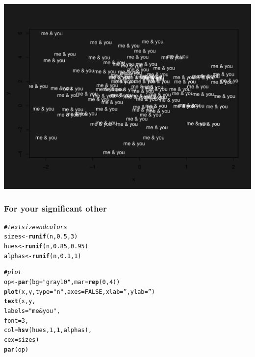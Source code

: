 \documentclass[12pt]{beamer}\usepackage[]{graphicx}\usepackage[]{color}
\makeatletter
\def\maxwidth{ %
  \ifdim\Gin@nat@width>\linewidth
    \linewidth
  \else
    \Gin@nat@width
  \fi
}
\newcommand{\hlnum}[1]{\textcolor[rgb]{0.686,0.059,0.569}{#1}}%
\newcommand{\hlstr}[1]{\textcolor[rgb]{0.192,0.494,0.8}{#1}}%
\newcommand{\hlcom}[1]{\textcolor[rgb]{0.678,0.584,0.686}{\textit{#1}}}%
\newcommand{\hlstd}[1]{\textcolor[rgb]{0.345,0.345,0.345}{#1}}%
\newcommand{\hlkwb}[1]{\textcolor[rgb]{0.69,0.353,0.396}{#1}}%
\newcommand{\hlkwc}[1]{\textcolor[rgb]{0.333,0.667,0.333}{#1}}%
\newcommand{\hlkwd}[1]{\textcolor[rgb]{0.737,0.353,0.396}{\textbf{#1}}}%
\newenvironment{kframe}{%
 \def\at@end@of@kframe{}%
 \ifinner\ifhmode%
  \def\at@end@of@kframe{\end{minipage}}%
  \begin{minipage}{\columnwidth}%
 \fi\fi%
 \def\FrameCommand##1{\hskip\@totalleftmargin \hskip-\fboxsep
 \colorbox{shadecolor}{##1}\hskip-\fboxsep
     \hskip-\linewidth \hskip-\@totalleftmargin \hskip\columnwidth}%
 \MakeFramed {\advance\hsize-\width
   \@totalleftmargin\z@ \linewidth\hsize
   \@setminipage}}%
 {\par\unskip\endMakeFramed%
 \at@end@of@kframe}
\newenvironment{knitrout}{}{} %
\makeatother
\begin{document}

\begin{frame}[fragile]

\begin{knitrout}
\color{fgcolor}
\includegraphics[width=\maxwidth]{figure/me-and-you2-1} 

\end{knitrout}

\end{frame}


\begin{frame}[fragile]
\frametitle{For your significant other}

\begin{knitrout}\footnotesize
{}\color{fgcolor}\begin{kframe}
\begin{alltt}
\hlcom{# text size and colors}
\hlstd{sizes} \hlkwb{<-} \hlkwd{runif}\hlstd{(n,} \hlnum{0.5}\hlstd{,} \hlnum{3}\hlstd{)}
\hlstd{hues} \hlkwb{<-} \hlkwd{runif}\hlstd{(n,} \hlnum{0.85}\hlstd{,} \hlnum{0.95}\hlstd{)}
\hlstd{alphas} \hlkwb{<-} \hlkwd{runif}\hlstd{(n,} \hlnum{0.1}\hlstd{,} \hlnum{1}\hlstd{)}

\hlcom{# plot}
\hlstd{op} \hlkwb{<-} \hlkwd{par}\hlstd{(}\hlkwc{bg} \hlstd{=} \hlstr{"gray10"}\hlstd{,} \hlkwc{mar} \hlstd{=} \hlkwd{rep}\hlstd{(}\hlnum{0}\hlstd{,} \hlnum{4}\hlstd{))}
\hlkwd{plot}\hlstd{(x, y,} \hlkwc{type} \hlstd{=} \hlstr{"n"}\hlstd{,} \hlkwc{axes} \hlstd{=} \hlnum{FALSE}\hlstd{,} \hlkwc{xlab} \hlstd{=} \hlstr{''}\hlstd{,} \hlkwc{ylab} \hlstd{=} \hlstr{''}\hlstd{)}
\hlkwd{text}\hlstd{(x, y,}
     \hlkwc{labels} \hlstd{=} \hlstr{"me & you"}\hlstd{,}
     \hlkwc{font} \hlstd{=} \hlnum{3}\hlstd{,}
     \hlkwc{col} \hlstd{=} \hlkwd{hsv}\hlstd{(hues,} \hlnum{1}\hlstd{,} \hlnum{1}\hlstd{, alphas),}
     \hlkwc{cex} \hlstd{= sizes)}
\hlkwd{par}\hlstd{(op)}
\end{alltt}
\end{kframe}
\end{knitrout}

\end{frame}
\end{document}
